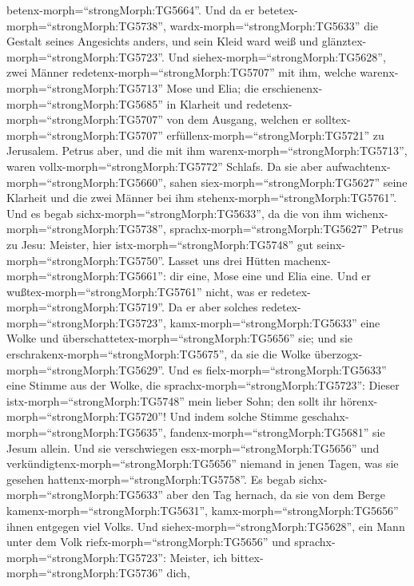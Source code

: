 betenx-morph=``strongMorph:TG5664''.  Und da er
betetex-morph=``strongMorph:TG5738'', wardx-morph=``strongMorph:TG5633''
die Gestalt seines Angesichts anders, und sein Kleid ward weiß und
glänztex-morph=``strongMorph:TG5723''.  Und
siehex-morph=``strongMorph:TG5628'', zwei Männer
redetenx-morph=``strongMorph:TG5707'' mit ihm, welche
warenx-morph=``strongMorph:TG5713'' Mose und Elia;  die
erschienenx-morph=``strongMorph:TG5685'' in Klarheit und
redetenx-morph=``strongMorph:TG5707'' von dem Ausgang, welchen er
solltex-morph=``strongMorph:TG5707''
erfüllenx-morph=``strongMorph:TG5721'' zu Jerusalem. 
Petrus aber, und die mit ihm warenx-morph=``strongMorph:TG5713'', waren
vollx-morph=``strongMorph:TG5772'' Schlafs. Da sie aber
aufwachtenx-morph=``strongMorph:TG5660'', sahen
siex-morph=``strongMorph:TG5627'' seine Klarheit und die zwei Männer bei
ihm stehenx-morph=``strongMorph:TG5761''.  Und es begab
sichx-morph=``strongMorph:TG5633'', da die von ihm
wichenx-morph=``strongMorph:TG5738'',
sprachx-morph=``strongMorph:TG5627'' Petrus zu Jesu: Meister, hier
istx-morph=``strongMorph:TG5748'' gut
seinx-morph=``strongMorph:TG5750''. Lasset uns drei Hütten
machenx-morph=``strongMorph:TG5661'': dir eine, Mose eine und Elia eine.
Und er wußtex-morph=``strongMorph:TG5761'' nicht, was er
redetex-morph=``strongMorph:TG5719''.  Da er aber solches
redetex-morph=``strongMorph:TG5723'', kamx-morph=``strongMorph:TG5633''
eine Wolke und überschattetex-morph=``strongMorph:TG5656'' sie; und sie
erschrakenx-morph=``strongMorph:TG5675'', da sie die Wolke
überzogx-morph=``strongMorph:TG5629''.  Und es
fielx-morph=``strongMorph:TG5633'' eine Stimme aus der Wolke, die
sprachx-morph=``strongMorph:TG5723'': Dieser
istx-morph=``strongMorph:TG5748'' mein lieber Sohn; den sollt ihr
hörenx-morph=``strongMorph:TG5720''!  Und indem solche
Stimme geschahx-morph=``strongMorph:TG5635'',
fandenx-morph=``strongMorph:TG5681'' sie Jesum allein. Und sie
verschwiegen esx-morph=``strongMorph:TG5656'' und
verkündigtenx-morph=``strongMorph:TG5656'' niemand in jenen Tagen, was
sie gesehen hattenx-morph=``strongMorph:TG5758''.  Es begab
sichx-morph=``strongMorph:TG5633'' aber den Tag hernach, da sie von dem
Berge kamenx-morph=``strongMorph:TG5631'',
kamx-morph=``strongMorph:TG5656'' ihnen entgegen viel Volks.
 Und siehex-morph=``strongMorph:TG5628'', ein Mann unter
dem Volk riefx-morph=``strongMorph:TG5656'' und
sprachx-morph=``strongMorph:TG5723'': Meister, ich
bittex-morph=``strongMorph:TG5736'' dich,
